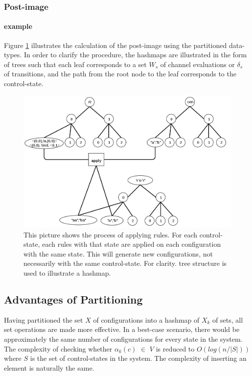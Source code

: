 \subsubsection{Post-image}
\paragraph{example}
Figure \ref{applyrule} illustrates the calculation of the post-image using the partitioned data-types. In order to clarify the procedure, the hashmaps are illustrated in the form of trees such that each leaf corresponds to a set $W_s$ of channel evaluations or $\delta_s$ of transitions, and the path from the root node to the leaf corresponds to the control-state.

\begin{figure}
\includegraphics[width=400pt] {bilder/applyrule.png}
\caption{This picture shows the process of applying rules. For each control-state, each rules with that state are applied on each configuration with the same state. This will generate new configurations, not necessarily with the same control-state. For clarity.  tree structure is used to illustrate a hashmap.}
\label{applyrule}
\end{figure}



\subsection{Advantages of Partitioning}
Having partitioned the set $X$ of configurations into a hashmap of $X_k$ of sets, all set operations are made more effective. In a best-case scenario, there would be approximately the same number of configurations for every state in the system. The complexity of checking whether $\alpha_k(c)$ $\in$ $V$ is reduced to $O(log (n/|S|))$ where $S$ is the set of control-states in the system. The complexity of inserting an element is naturally the same.

